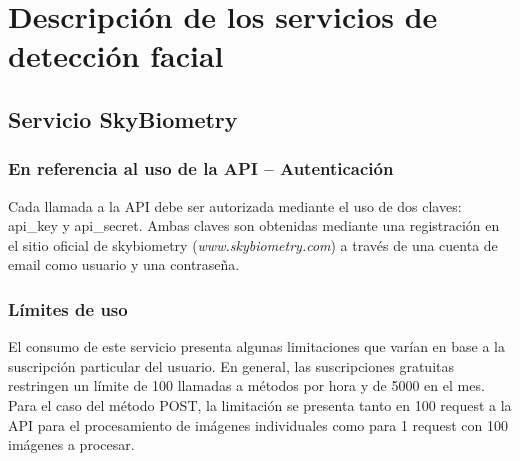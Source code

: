 
\chapter{Descripción de los servicios de detección facial \label{chap:Ambiente-de-desarrollo}}


\section*{Servicio SkyBiometry}


\subsection*{En referencia al uso de la API – Autenticación }

Cada llamada a la API debe ser autorizada mediante el uso de dos claves:
api\_key y api\_secret. Ambas claves son obtenidas mediante una registración
en el sitio oficial de skybiometry (\emph{www.skybiometry.com}) a
través de una cuenta de email como usuario y una contraseña.


\subsection*{Límites de uso }

El consumo de este servicio presenta algunas limitaciones que varían
en base a la suscripción particular del usuario. En general, las suscripciones
gratuitas restringen un límite de 100 llamadas a métodos por hora
y de 5000 en el mes. Para el caso del método POST, la limitación se
presenta tanto en 100 request a la API para el procesamiento de imágenes
individuales como para 1 request con 100 imágenes a procesar. 


